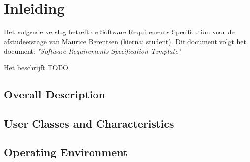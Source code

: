 \documentclass[a4paper, 11pt, oneside]{report}
\begin{document}

\tableofcontents
\clearpage







\chapter{Inleiding}
\label{chapter:inleiding}
Het volgende verslag betreft de Software Requirements Specification voor de afstudeerstage van Maurice Berentsen (hierna: student).
Dit document volgt het document: \textit{"Software Requirements Specification Template"} \cite{template:srs}

Het beschrijft TODO

\section{Overall Description}
\section{User Classes and Characteristics}
\section{Operating Environment}
\end{document}
